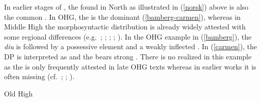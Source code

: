 \documentclass[output=paper,colorlinks,citecolor=brown]{langscibook}
\begin{document}
\ea {} \label{al-wine} 
\z
\z 

In earlier stages of , the  found in North  as illustrated in (\ref{norsk}) above is also the common . In OHG, the  is the dominant  (\ref{bamberg-carmen}), whereas in Middle High  the morphosyntactic distribution is already widely attested with some regional differences (e.g.~\citealp{Demske01}; \citealp{klein2007semantischen}; \citealp{kovari1984studien}; \citealp{Osthoff1876}; \citealp{ratkus2011}). In the OHG example in (\ref{bamberg}), the  \textit{diu} is followed by a possessive element and a weakly inflected . In (\ref{carmen}), the DP is interpreted as  and the  bears strong . There is no   realized in this example as the   is only frequently attested in late OHG texts whereas in earlier works it is often missing (cf.~\citealp{demske2020grammaticalization}; \citealp{Oubouzar1992}; \citealp{Presslich2000}).


\ea Old High  \label{bamberg-carmen}
\z
\z 
\end{document}
